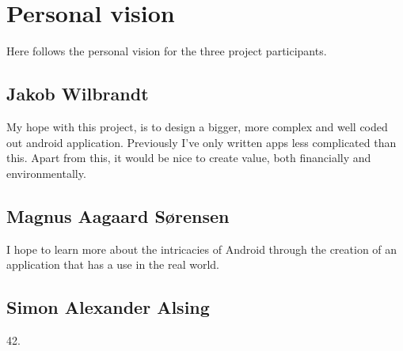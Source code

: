 
\chapter{Personal vision}
Here follows the personal vision for the three project participants.

\section{Jakob Wilbrandt}

My hope with this project, is to design a bigger, more complex and well coded out android application. Previously I've only written apps less complicated than this. Apart from this, it would be nice to create value, both financially and environmentally.


\section{Magnus Aagaard Sørensen}
I hope to learn more about the intricacies of Android through the creation of an application that has a use in the real world.


\section{Simon Alexander Alsing}

42.